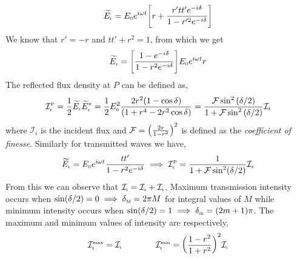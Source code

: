 \begin{align}
    \widetilde{E}_{\text{\tiny r}} = E_{\text{\tiny 0}}e^{i\omega t}\qty[r + \frac{r'tt'e^{-i\delta}}{1-r'^2e^{-i\delta}}]
\end{align}
We know that $r'= -r$ and $tt'+r^2=1$, from which we get 
\begin{align}
     \widetilde{E}_{\text{\tiny r}} = \qty[ \frac{1-e^{-i\delta}}{1-r^2e^{-i\delta}}]E_{\text{\tiny 0}}e^{i\omega t}r
\end{align}
The reflected flux density at $P$ can be defined as,
\begin{align}
    \mathcal{I}_{\text{\tiny r}}^{\text{\tiny P}} = \frac{1}{2}\widetilde{E}_{\text{\tiny r}}\widetilde{E}_{\text{\tiny r}}^* = \frac{1}{2}E_{\text{\tiny 0}}^2\frac{2r^2(1-\cos\delta)}{(1+r^4-2r^2\cos\delta)} =  \frac{\mathcal{F}\sin^2\qty(\delta/2)}{1+\mathcal{F}\sin^2\qty(\delta/2)}\mathcal{I}_i
\end{align}
where $\mathcal{I}_i$ is the incident flux and $\mathcal{F}=\qty(\frac{2r}{1-r^2})^2$ is defined as the \textit{coefficient of finesse}. Similarly for transmitted waves we have, 
\begin{align}
    \widetilde{E}_{\text{\tiny t}} = E_{\text{\tiny 0}}e^{i\omega t}\frac{tt'}{1-r^2e^{-i\delta}} \implies  \mathcal{I}_{\text{\tiny t}}^{\text{\tiny P}} = \frac{1}{1+\mathcal{F}\sin^2(\delta/2)}\mathcal{I}_i
\end{align}
From this we can observe that $\mathcal{I}_{\text{\tiny i}} = \mathcal{I}_{\text{\tiny r}}+\mathcal{I}_{\text{\tiny t}}$. Maximum transmission intensity occurs when $\sin(\delta/2)=0\implies \delta_{\text{\tiny M}}=2\pi M$ for integral values of $M$ while minimum intensity occurs when $\sin(\delta/2)=1\implies \delta_{\text{\tiny m}}=(2m+1)\pi$. The maximum and minimum values of intensity are respectively, 
\begin{align}
    \mathcal{I}_{\text{\tiny t}}^{\text{\tiny max}} = \mathcal{I}_{\text{\tiny i}} \qquad \qquad \mathcal{I}_{\text{\tiny t}}^{\text{\tiny min}} =\qty(\frac{1-r^2}{1+r^2})^2 \mathcal{I}_{\text{\tiny i}}
\end{align}
